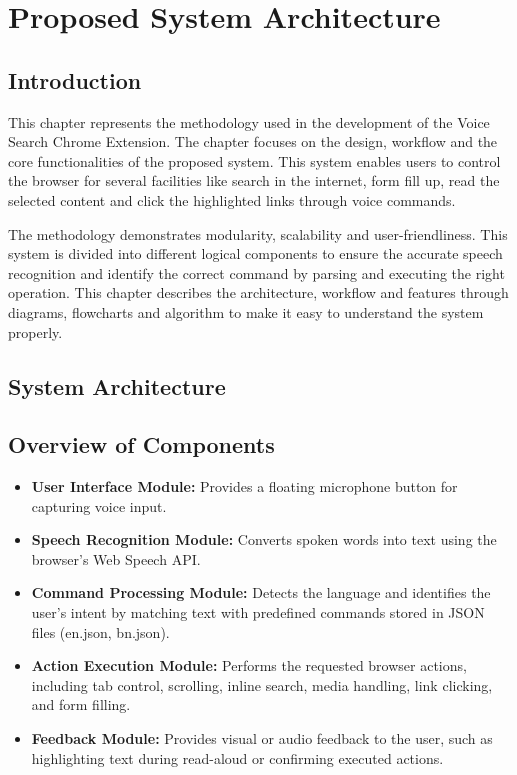 \chapter{Proposed System Architecture}
\section{Introduction}
This chapter represents the methodology used in the development of the Voice Search Chrome Extension. The chapter focuses on the design, workflow and the core functionalities of the proposed system. This system enables users to control the browser for several facilities like search in the internet, form fill up, read the selected content and click the highlighted links through voice commands.

The methodology demonstrates modularity, scalability and user-friendliness. This system is divided into different logical components to ensure the accurate speech recognition and identify the correct command by parsing and executing the right operation. This chapter describes the architecture, workflow and features through diagrams, flowcharts and algorithm to make it easy to understand the system properly.

\section{System Architecture}
\section*{Overview of Components}
\begin{itemize} 
\item \textbf{User Interface Module:} Provides a floating microphone button for capturing voice input.
\item \textbf{Speech Recognition Module:} Converts spoken words into text using the browser’s Web Speech API.
\item \textbf{Command Processing Module:} Detects the language and identifies the user’s intent by matching text with predefined commands stored in JSON files (en.json, bn.json).
\item \textbf{Action Execution Module:} Performs the requested browser actions, including tab control, scrolling, inline search, media handling, link clicking, and form filling.
\item \textbf{Feedback Module:} Provides visual or audio feedback to the user, such as highlighting text during read-aloud or confirming executed actions.
\end{itemize}

